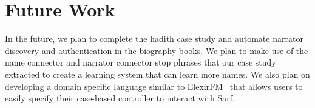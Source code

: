 \documentclass[11pt,letterpaper]{article}
\begin{document}
\section{Future Work}
\label{sec:future}

In the future, we plan to complete the hadith case study 
and automate narrator discovery and authentication in the 
biography books. 
We plan to make use of the name connector and narrator
connector stop phrases that our case study extracted to create a 
learning system that can learn more names. 
We also plan on developing a domain specific language similar 
to ElexirFM~\cite{Otakar:07}
that allows users to easily specify their case-based controller
to interact with Sarf.








{\small }
\end{document}
